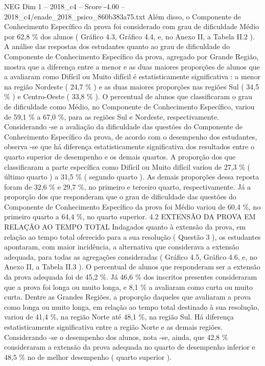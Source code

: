 \begin{textsample}{NEG Dim 1 – 2018\_c4 – Score -4.00 – 2018\_c4/enade\_2018\_psico\_860b383a75.txt}
Além disso, o Componente de Conhecimento Específico da prova foi considerado com grau de dificuldade Médio por 62,8 \% dos alunos ( Gráfico 4.3, Gráfico 4.4, e, no Anexo II, a Tabela II.2 ).
A análise das respostas dos estudantes quanto ao grau de dificuldade do Componente de Conhecimento Específico da prova, agregado por Grande Região, mostra que a diferença entre a menor e as duas maiores proporções de alunos que a avaliaram como Difícil ou Muito difícil é estatisticamente significativa : a menor na região Nordeste ( 24,7 \% ) e as duas maiores proporções nas regiões Sul ( 34,5 \% ) e Centro-Oeste ( 33,8 \% ).
O percentual de alunos que classificaram o grau de dificuldade como Médio, no Componente de Conhecimento Específico, variou de 59,1 \% a 67,0 \%, para as regiões Sul e Nordeste, respectivamente.
Considerando -se a avaliação da dificuldade das questões do Componente de Conhecimento Específico da prova, de acordo com o desempenho dos estudantes, observa -se que há diferença estatisticamente significativa dos resultados entre o quarto superior de desempenho e os demais quartos.
A proporção dos que classificaram a parte específica como Difícil ou Muito difícil variou de 27,3 \% ( último quarto ) a 31,5 \% ( segundo quarto ).
As demais proporções dessa reposta foram de 32,6 \% e 29,7 \%, no primeiro e terceiro quarto, respectivamente.
Já a proporção dos que responderam que o grau de dificuldade das questões do Componente de Conhecimento Específico da prova foi Médio variou de 60,4 \%, no primeiro quarto a 64,4 \%, no quarto superior. 4.2 EXTENSÃO DA PROVA EM RELAÇÃO AO TEMPO TOTAL Indagados quanto à extensão da prova, em relação ao tempo total oferecido para a sua resolução ( Questão 3 ), os estudantes apontaram, com maior incidência, a alternativa que considerava a extensão adequada, para todas as agregações consideradas ( Gráfico 4.5, Gráfico 4.6, e, no Anexo II, a Tabela II.3 ).
O percentual de alunos que responderam ser a extensão da prova adequada foi de 45,2 \%.
Já 46,6 \% dos inscritos presentes consideraram que a prova foi longa ou muito longa, e 8,1 \% a avaliaram como curta ou muito curta.
Dentre as Grandes Regiões, a proporção daqueles que avaliaram a prova como longa ou muito longa, em relação ao tempo total destinado à sua resolução, variou de 41,4 \%, na região Norte até 48,1 \%, na região Sul.
Há diferença estatisticamente significativa entre a região Norte e as demais regiões.
Considerando -se o desempenho dos alunos, nota -se, ainda, que 42,8 \% consideraram a extensão da prova adequada no quarto de desempenho inferior e 48,5 \% no de melhor desempenho ( quarto superior ).

\end{textsample}
